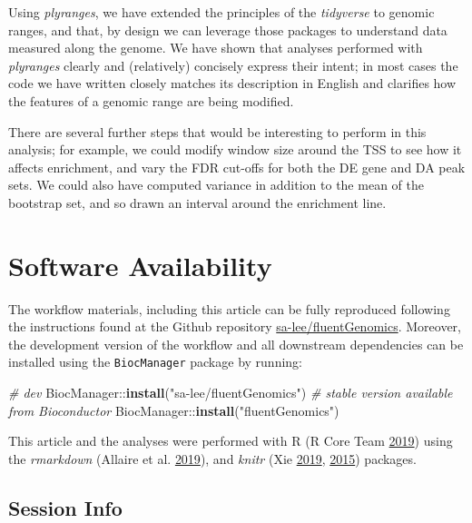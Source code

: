 \documentclass[
]{article}
\newenvironment{Shaded}{}{}
\newcommand{\CommentTok}[1]{\textcolor[rgb]{0.38,0.63,0.69}{\textit{#1}}}
\newcommand{\KeywordTok}[1]{\textcolor[rgb]{0.00,0.44,0.13}{\textbf{#1}}}
\newcommand{\NormalTok}[1]{#1}
\newcommand{\OperatorTok}[1]{\textcolor[rgb]{0.40,0.40,0.40}{#1}}
\newcommand{\StringTok}[1]{\textcolor[rgb]{0.25,0.44,0.63}{#1}}
\begin{document}
Using \emph{plyranges}, we have extended the principles of the \emph{tidyverse} to
genomic ranges, and that, by design we can leverage those packages to understand
data measured along the genome. We have shown that analyses performed with
\emph{plyranges} clearly and (relatively) concisely express their intent; in most
cases the code we have written closely matches its description in English and
clarifies how the features of a genomic range are being modified.

There are several further steps that would be interesting to perform in this
analysis; for example, we could modify window size around the TSS to see how it
affects enrichment, and vary the FDR cut-offs for
both the DE gene and DA peak sets. We could also have computed variance in addition to
the mean of the bootstrap set, and so drawn an interval around the enrichment
line.

\hypertarget{software-availability}{%
\section{Software Availability}\label{software-availability}}

The workflow materials, including this article can be fully reproduced
following the instructions found at the Github repository
\href{https://github.com/sa-lee/fluentGenomics}{sa-lee/fluentGenomics}. Moreover,
the development version of the workflow and all downstream dependencies can be
installed using the \texttt{BiocManager} package by running:

\begin{Shaded}
\begin{Highlighting}[]
\CommentTok{# dev}
\NormalTok{BiocManager}\OperatorTok{::}\KeywordTok{install}\NormalTok{(}\StringTok{"sa-lee/fluentGenomics"}\NormalTok{)}
\CommentTok{# stable version available from Bioconductor}
\NormalTok{BiocManager}\OperatorTok{::}\KeywordTok{install}\NormalTok{(}\StringTok{"fluentGenomics"}\NormalTok{)}
\end{Highlighting}
\end{Shaded}

This article and the analyses were performed with R (R Core Team \protect\hyperlink{ref-baser}{2019}) using the
\emph{rmarkdown} (Allaire et al. \protect\hyperlink{ref-rmarkdown}{2019}), and \emph{knitr} (Xie \protect\hyperlink{ref-knitr}{2019}, \protect\hyperlink{ref-xie2015}{2015}) packages.

\hypertarget{session-info}{%
\subsection{Session Info}\label{session-info}}
\end{document}

